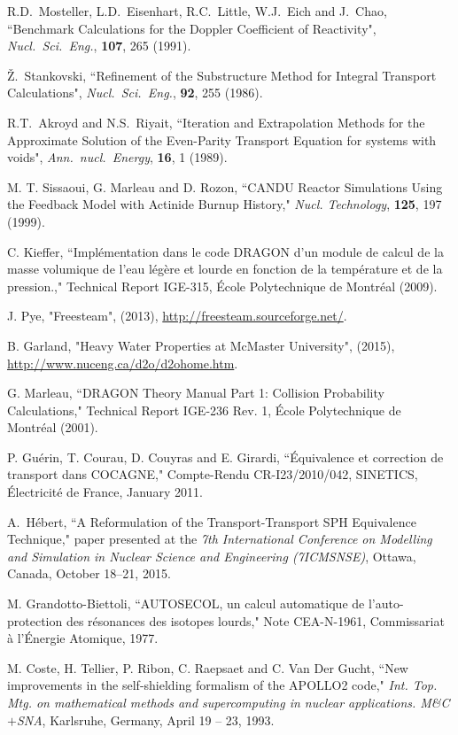 \begin{thebibliography}{99}
R.D.~Mosteller, L.D.~Eisenhart, R.C.~Little, W.J.~Eich and J.~Chao, ``Benchmark
Calculations for the Doppler Coefficient of Reactivity", {\sl Nucl.~Sci.~Eng.},
{\bf 107}, 265 (1991).

\v{Z}.~Stankovski, ``Refinement of the Substructure Method for Integral
Transport Calculations", {\sl Nucl.~Sci.~Eng.}, {\bf 92}, 255 (1986).

R.T.~Akroyd and N.S.~Riyait, ``Iteration and Extrapolation Methods for the
Approximate Solution of the Even-Parity Transport Equation for systems with
voids", {\sl Ann.~nucl.~Energy}, {\bf 16}, 1 (1989).

M. T. Sissaoui, G. Marleau and D. Rozon, ``CANDU Reactor Simulations Using the
Feedback Model with Actinide Burnup History," {\sl Nucl. Technology}, {\bf 125},
197 (1999).

C. Kieffer, ``Impl\'{e}mentation dans le code DRAGON d'un module de calcul de la masse volumique de l'eau l\'{e}g\`{e}re et lourde en fonction de la temp\'{e}rature et de la pression.," Technical Report IGE-315, \'Ecole Polytechnique de Montr\'eal (2009).

J. Pye, "Freesteam", (2013),
  \url{http://freesteam.sourceforge.net/}.

B. Garland, "Heavy Water Properties at McMaster University", (2015), \url{http://www.nuceng.ca/d2o/d2ohome.htm}.

G. Marleau, ``DRAGON Theory Manual Part 1: Collision Probability Calculations," Technical Report IGE-236 
Rev. 1, \'Ecole Polytechnique de Montr\'eal (2001).

P. Gu\'erin, T. Courau, D. Couyras and E. Girardi, ``\'Equivalence et correction de transport dans COCAGNE," Compte-Rendu CR-I23/2010/042, SINETICS, \'Electricit\'e de France, January 2011.

A.~H\'ebert, ``A Reformulation of the Transport-Transport SPH Equivalence Technique," paper presented at the
\textsl{7th International Conference on Modelling and Simulation in Nuclear Science and Engineering (7ICMSNSE)}, Ottawa, Canada, October 18--21, 2015.

M. Grandotto-Biettoli, ``AUTOSECOL, un calcul automatique de l'auto-protection
des r\'esonances des isotopes lourds," Note CEA-N-1961, Commissariat \`a
l'\'Energie Atomique, 1977. 

M. Coste, H. Tellier, P. Ribon, C. Raepsaet and C. Van Der Gucht, ``New improvements in the self-shielding
formalism of the APOLLO2 code,"
{\sl Int. Top. Mtg. on mathematical methods and supercomputing in nuclear applications. M\&C$+$SNA},
Karlsruhe, Germany, April 19 -- 23, 1993.


\end{thebibliography}
